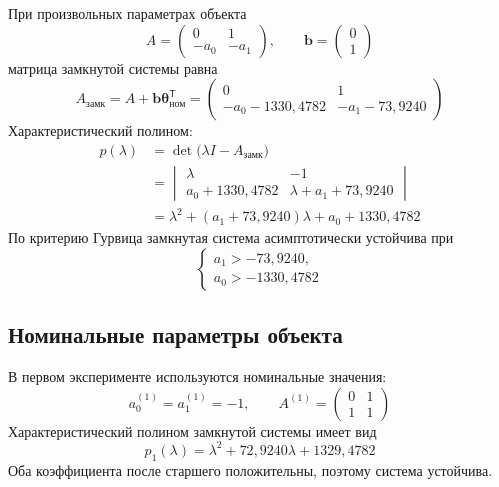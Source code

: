 При произвольных параметрах объекта
\begin{equation}
  A=\begin{pmatrix}0&1\\-a_0&-a_1\end{pmatrix},
  \qquad \bm b=\begin{pmatrix}0\\1\end{pmatrix}
\end{equation}
матрица замкнутой системы равна
\begin{equation}
  A_{\text{замк}}=A+\bm b\bm\theta_{\text{ном}}^{\mathsf T}
  =\begin{pmatrix}
    0&1\\
    -a_0-1330{,}4782&-a_1-73{,}9240
  \end{pmatrix}
\end{equation}
Характеристический полином:
\begin{equation}
  \begin{aligned}
    p(\lambda)&=\det\bigl(\lambda I-A_{\text{замк}}\bigr)\\
    &=\begin{vmatrix}
      \lambda&-1\\
      a_0+1330{,}4782&\lambda+a_1+73{,}9240
    \end{vmatrix}\\
    &=\lambda^2+(a_1+73{,}9240)\lambda+a_0+1330{,}4782
  \end{aligned}
\end{equation}
По критерию Гурвица замкнутая система асимптотически устойчива при
\begin{equation}
  \boxed{
  \begin{cases}
    a_1>-73{,}9240,\\
    a_0>-1330{,}4782
  \end{cases}}
\end{equation}

\subsection{Номинальные параметры объекта}

В первом эксперименте используются номинальные значения:
\begin{equation}
  a_0^{(1)}=a_1^{(1)}=-1,
  \qquad A^{(1)}=\begin{pmatrix}0&1\\1&1\end{pmatrix}
\end{equation}
Характеристический полином замкнутой системы имеет вид
\begin{equation}
  p_1(\lambda)=\lambda^2+72{,}9240\lambda+1329{,}4782
\end{equation}
Оба коэффициента после старшего положительны, поэтому система устойчива.

